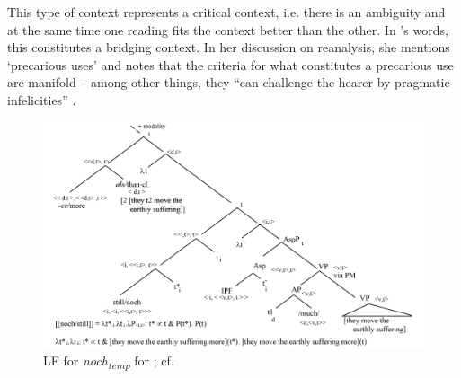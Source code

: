 \documentclass[output=paper,
modfonts
]{langscibook}
\begin{document}
This type of context represents a critical context, i.e. there is an ambiguity and at the same time one reading fits the context better than the other. In \citeauthor{Eckardt_2011}'s \citeyearpar{Eckardt_2011} words, this constitutes a bridging context. In her discussion on reanalysis, she mentions `precarious uses' and notes that the criteria for what constitutes a precarious use are manifold -- among other things, they ``can challenge the hearer by pragmatic infelicities'' \citep[44]{Eckardt_2011}.

\begin{figure}
\includegraphics[width=1\textwidth]{figures/LF1_temp_>_over_noch}
\caption{LF for \textit{noch\textsubscript{temp}} for ; cf. \citep{beck2016a_sub}}
\label{fig:LF1_temp_>_over_noch}
\end{figure}
\end{document}
